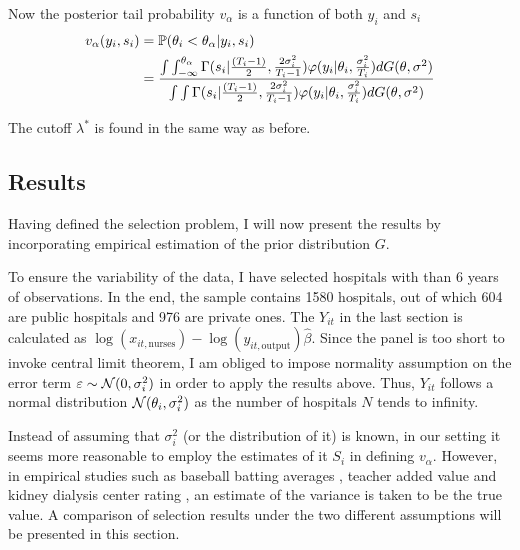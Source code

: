 \documentclass[12pt]{article}
\begin{document}
Now the posterior tail probability $v_\alpha$ is a function of both $y_i$ and
$s_i$
\begin{align*}
    v_\alpha(y_i,s_i) & =\mathbb{P}(\theta_i<\theta_\alpha|y_i,s_i)                                                                                                                                                                                                                                                                \\
                      & =\frac{\int\int_{-\infty}^{\theta_\alpha} \Gamma(s_i|\frac{(T_i-1)}{2},\frac{2\sigma_i^2}{T_i-1})\varphi(y_i|\theta_i,\frac{\sigma_i^2}{T_i})dG(\theta,\sigma^2)}{\int\int \Gamma(s_i|\frac{(T_i-1)}{2},\frac{2\sigma_i^2}{T_i-1})\varphi(y_i|\theta_i,\frac{\sigma_i^2}{T_i})dG(\theta,\sigma^2)} \\
\end{align*}

The cutoff $\lambda^*$ is found in the same way as before.

\subsection{Results}

Having defined the selection problem, I will now present the results by
incorporating empirical estimation of the prior distribution \( G \).

To ensure the variability of the data, I have selected hospitals with than 6
years of observations. In the end, the sample contains 1580 hospitals, out of
which 604 are public hospitals and 976 are private ones. The $Y_{it}$ in the
last section is calculated as $ \log(x_{it,\text{nurses}}) -
    \log(y_{it,\text{output}})\hat{\beta}$. Since the panel is too short to invoke
central limit theorem, I am obliged to impose normality assumption on the error
term $\varepsilon \sim \mathcal{N}(0,\sigma_i^2)$ in order to apply the results
above. Thus, $Y_{it}$ follows a normal distribution
$\mathcal{N}(\theta_i,\sigma_i^2)$ as the number of hospitals $N$ tends to infinity.

Instead of assuming that $\sigma_i^2$ (or the distribution of it) is known, in
our setting it seems more reasonable to employ the estimates of it $S_i$ in
defining $v_\alpha$. However, in empirical studies such as baseball batting
averages \citep{gu2017empirical}, teacher added value \citep{gilraine2020new}
and kidney dialysis center rating \citep{gu2023invidious}, an estimate of the
variance is taken to be the true value. A comparison of selection results under
the two different assumptions will be presented in this section.
\end{document}
